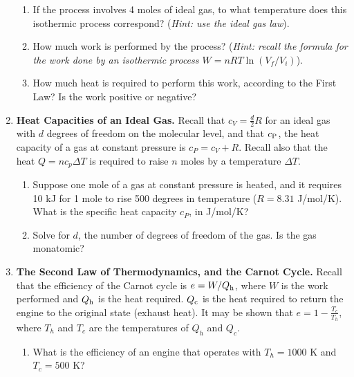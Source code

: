 \documentclass[10pt]{article}
\begin{document}
\begin{enumerate}
\begin{enumerate}
\item If the process involves 4 moles of ideal gas, to what temperature does this isothermic process correspond?  (\textit{Hint: use the ideal gas law}). \\ \vspace{2cm}
\item How much work is performed by the process?  (\textit{Hint: recall the formula for the work done by an isothermic process $W = nRT\ln(V_f/V_i)$}). \\ \vspace{2cm}
\item How much heat is required to perform this work, according to the First Law? Is the work positive or negative? \\ \vspace{2cm}
\end{enumerate}
\item \textbf{Heat Capacities of an Ideal Gas.} Recall that $c_{V} = \frac{d}{2}R$ for an ideal gas with $d$ degrees of freedom on the molecular level, and that $c_{\rm P}$, the heat capacity of a gas at constant pressure is $c_{P} = c_{V} + R$.  Recall also that the heat $Q = n c_p \Delta T$ is required to raise $n$ moles by a temperature $\Delta T$.
\begin{enumerate}
\item Suppose one mole of a gas at constant pressure is heated, and it requires 10 kJ for 1 mole to rise 500 degrees in temperature ($R = 8.31$ J/mol/K).  What is the specific heat capacity $c_P$, in J/mol/K? \\ \vspace{1cm}
\item Solve for $d$, the number of degrees of freedom of the gas.  Is the gas monatomic? \\ \vspace{1.5cm}
\end{enumerate}
\item \textbf{The Second Law of Thermodynamics, and the Carnot Cycle.}  Recall that the efficiency of the Carnot cycle is $e = W/Q_{\rm h}$, where $W$ is the work performed and $Q_{\rm h}$ is the heat required.  $Q_{\rm c}$ is the heat required to return the engine to the original state (exhaust heat).  It may be shown that $e = 1 - \frac{T_c}{T_h}$, where $T_h$ and $T_c$ are the temperatures of $Q_h$ and $Q_c$.
\begin{enumerate}
\item What is the efficiency of an engine that operates with $T_h = 1000$ K and $T_c = 500$ K? \\ \vspace{2cm}

\end{enumerate}
\end{enumerate}
\end{document}
